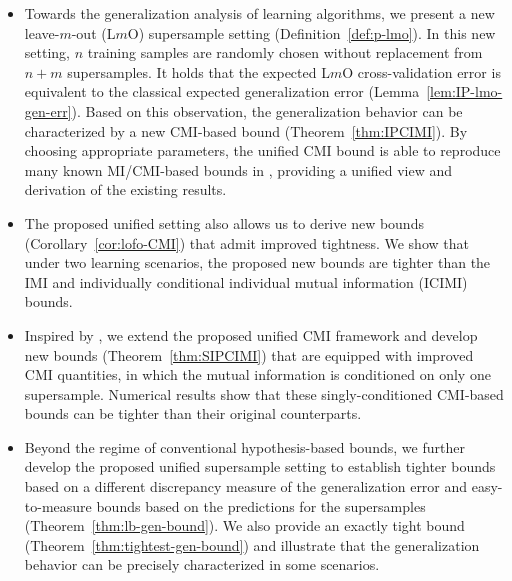 \documentclass[onecolumn,romanappendices,10pt]{IEEEtran}
\begin{document}
	\begin{itemize}
		\item Towards the generalization analysis of learning algorithms, we present a new leave-$m$-out (L$m$O) supersample setting (Definition~\ref{def:p-lmo}). In this new setting, $n$ training samples are randomly chosen without replacement from $n+m$ supersamples. It holds that the expected L$m$O cross-validation error is equivalent to the classical expected generalization error (Lemma~\ref{lem:IP-lmo-gen-err}). Based on this observation, the generalization behavior can be characterized by a new CMI-based bound (Theorem~\ref{thm:IPCIMI}). By choosing appropriate parameters, the unified CMI bound is able to reproduce many known MI/CMI-based bounds in \cite{xu2017information,bu2020tightening,zhou2022individually,rammal2022leave,haghifam2022understanding}, providing a unified view and derivation of the existing results. 
		\item The proposed unified setting also allows us to derive new bounds (Corollary~\ref{cor:lofo-CMI}) that admit improved tightness. We show that under two learning scenarios, the proposed new bounds are tighter than the IMI \cite{bu2020tightening} and individually conditional individual mutual information (ICIMI) \cite{zhou2022individually} bounds.
		\item Inspired by \cite{dongexactly}, we extend the proposed unified CMI framework and develop new bounds (Theorem~\ref{thm:SIPCIMI}) that are equipped with improved CMI quantities, in which the mutual information is conditioned on only one supersample. Numerical results show that these singly-conditioned CMI-based bounds can be tighter than their original counterparts.
		\item Beyond the regime of conventional hypothesis-based bounds, we further develop the proposed unified supersample setting to establish tighter bounds based on a different discrepancy measure of the generalization error and easy-to-measure bounds based on the predictions for the supersamples (Theorem~\ref{thm:lb-gen-bound}). We also provide an exactly tight bound (Theorem~\ref{thm:tightest-gen-bound}) and illustrate that the generalization behavior can be precisely characterized in some scenarios.
	\end{itemize}
	
\end{document}

